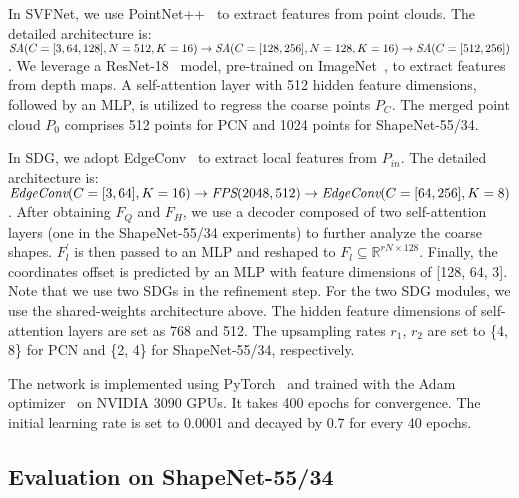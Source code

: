 In SVFNet, we use PointNet++~\citep{qi2017pointnet++} to extract features from point clouds. The detailed architecture is: 
$\emph{SA}(C = [3,64,128], N = 512, K = 16)\rightarrow\emph{SA}(C = [128,256], N = 128, K = 16)\rightarrow\emph{SA}(C = [512,256])$. 
We leverage a ResNet-18~\citep{he2016deep} model, pre-trained on ImageNet~\citep{5206848}, to extract features from depth maps. A self-attention layer with 512 hidden feature dimensions, followed by an MLP, is utilized to regress the coarse points $P_C$. The merged point cloud $P_0$ comprises 512 points for PCN and 1024 points for ShapeNet-55/34.

In SDG, we adopt EdgeConv~\citep{wang2019dynamic} to extract local features from $P_{in}$. The detailed architecture is:
$\emph{EdgeConv}(C = [3,64], K = 16)\rightarrow\emph{FPS}(2048,512)\rightarrow\emph{EdgeConv}(C = [64,256], K = 8)$. 
After obtaining $F_Q$ and $F_H$, we use a decoder composed of two self-attention layers (one in the ShapeNet-55/34 experiments) to further analyze the coarse shapes.
$F_{l}^{\prime}$ is then passed to an MLP and reshaped to $F_{l}\subseteq\mathbb{R}^{rN\times 128}$. Finally, the coordinates offset is predicted by an MLP with feature dimensions of [128, 64, 3].
Note that we use two SDGs in the refinement step. 
For the two SDG modules, we use the shared-weights architecture above. The hidden feature dimensions of self-attention layers are set as 768 and 512. 
The upsampling rates {$r_1$, $r_2$} are set to \{4, 8\} for PCN and \{2, 4\} for ShapeNet-55/34, respectively.

The network is implemented using PyTorch~\citep{paszke2019pytorch} and trained with the Adam optimizer~\citep{kingma2014adam} on NVIDIA 3090 GPUs. It takes 400 epochs for convergence. The initial learning rate is set to 0.0001 and decayed by 0.7 for every 40 epochs.


\subsection{Evaluation on ShapeNet-55/34}
